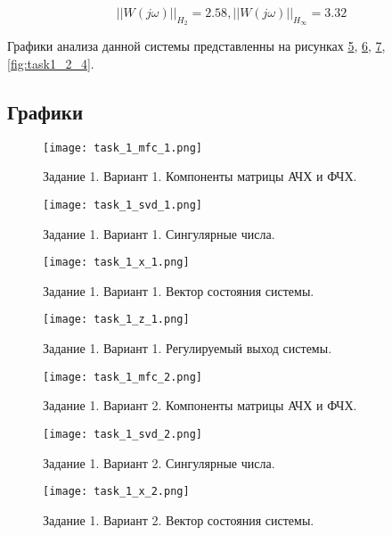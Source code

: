 \begin{equation*}
    ||W(j\omega)||_{H_2} = 2.58, ||W(j\omega)||_{H_\infty} = 3.32
\end{equation*}

Графики анализа данной системы представленны на рисунках \ref{fig:task1_2_1}, \ref{fig:task1_2_2}, \ref{fig:task1_2_3}, \ref{fig:task1_2_4}.


\subsection{Графики}
\begin{figure}[]
    \centering
    \texttt{[image: task\_1\_mfc\_1.png]}
    \caption{\label{fig:task1_1_1}Задание 1. Вариант 1. Компоненты матрицы АЧХ и ФЧХ.}
\end{figure}

\begin{figure}[]
    \centering
    \texttt{[image: task\_1\_svd\_1.png]}
    \caption{\label{fig:task1_1_2}Задание 1. Вариант 1. Сингулярные числа.}
\end{figure}

\begin{figure}[]
    \centering
    \texttt{[image: task\_1\_x\_1.png]}
    \caption{\label{fig:task1_1_3}Задание 1. Вариант 1. Вектор состояния системы.}
\end{figure}

\begin{figure}[]
    \centering
    \texttt{[image: task\_1\_z\_1.png]}
    \caption{\label{fig:task1_1_4}Задание 1. Вариант 1. Регулируемый выход системы.}
\end{figure}

\begin{figure}[]
    \centering
    \texttt{[image: task\_1\_mfc\_2.png]}
    \caption{\label{fig:task1_2_1}Задание 1. Вариант 2. Компоненты матрицы АЧХ и ФЧХ.}
\end{figure}

\begin{figure}[]
    \centering
    \texttt{[image: task\_1\_svd\_2.png]}
    \caption{\label{fig:task1_2_2}Задание 1. Вариант 2. Сингулярные числа.}
\end{figure}

\begin{figure}[]
    \centering
    \texttt{[image: task\_1\_x\_2.png]}
    \caption{\label{fig:task1_2_3}Задание 1. Вариант 2. Вектор состояния системы.}
\end{figure}

